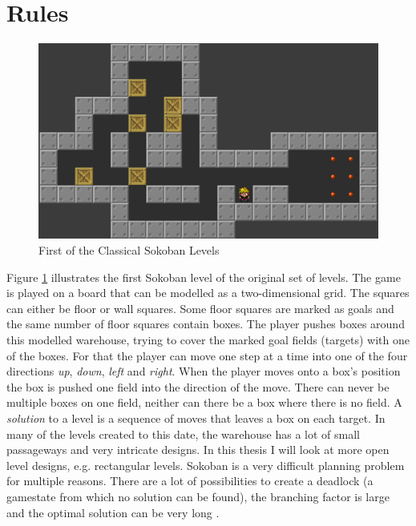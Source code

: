 \documentclass{report}
\begin{document}
\section{Rules}
\begin{figure}[h]
\centering
\includegraphics[scale=0.2]{SokobanLevel1}
\caption{First of the Classical Sokoban Levels}
\label{fig:1}
\end{figure}
Figure \ref{fig:1} illustrates the first Sokoban level of the original set of levels. The game is played on a board that can be modelled as a two-dimensional grid. The squares can either be floor or wall squares. Some floor squares are marked as goals and the same number of floor squares contain boxes. The player pushes boxes around this modelled warehouse, trying to cover the marked goal fields (targets) with one of the boxes. For that the player can move one step at a time into one of the four directions \textit{up}, \textit{down}, \textit{left} and \textit{right}. When the player moves onto a box's position the box is pushed one field into the direction of the move. There can never be multiple boxes on one field, neither can there be a box where there is no field. A \textit{solution} to a level is a sequence of moves that leaves a box on each target.
In many of the levels created to this date, the warehouse has a lot of small passageways and very intricate designs. In this thesis I will look at more open level designs, e.g. rectangular levels.
Sokoban is a very difficult planning problem for multiple reasons. There are a lot of possibilities to create a deadlock (a gamestate from which no solution can be found), the branching factor is large and the optimal solution can be very long \cite{BoteaHeuristicsVsPlanning}.

\end{document}
